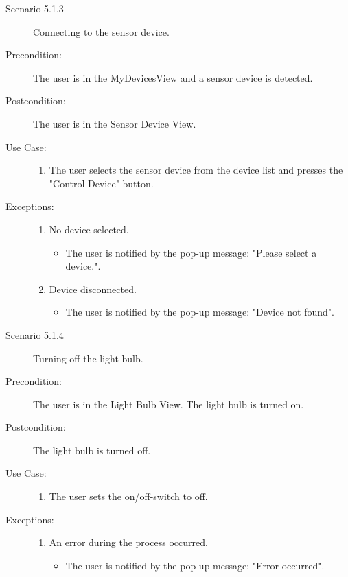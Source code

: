 \documentclass[a4paper]{article}
\begin{document}
\begin{description}
\item[]

\item[Scenario 5.1.3] Connecting to the sensor device.
\item[Precondition:] The user is in the MyDevicesView and a sensor device is detected.
\item[Postcondition:] The user is in the Sensor Device View.
\item[Use Case:]\mbox{}
\begin{enumerate}
\item \label{1_sensor} The user selects the sensor device from the device list and presses the "Control Device"-button.
\end{enumerate}

\item[Exceptions:]
\item[]
\begin{enumerate}
\item No device selected.
\begin{itemize}
\item The user is notified by the pop-up message: "Please select a device.".
\end{itemize}
\item Device disconnected.
\begin{itemize}
\item The user is notified by the pop-up message: "Device not found".
\end{itemize}
\end{enumerate}

\item[]

\item[Scenario 5.1.4] Turning off the light bulb.
\item[Precondition:] The user is in the Light Bulb View. The light bulb is turned on.
\item[Postcondition:] The light bulb is turned off.
\item[Use Case:]\mbox{}
\begin{enumerate}
\item  The user sets the on/off-switch to off.
\end{enumerate}

\item[Exceptions:]
\item[]
\begin{enumerate}
\item An error during the process occurred.
\begin{itemize}
\item The user is notified by the pop-up message: "Error occurred".
\end{itemize}
\end{enumerate}


\end{description}
\end{document}

